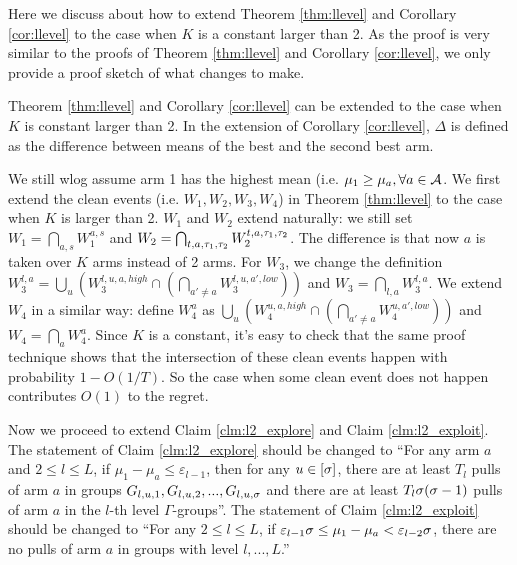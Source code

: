 Here we discuss about how to extend Theorem \ref{thm:llevel} and Corollary \ref{cor:llevel} to the case when $K$ is a constant larger than 2. As the proof is very similar to the proofs of Theorem \ref{thm:llevel} and Corollary \ref{cor:llevel}, we only provide a proof sketch of what changes to make.

\begin{theorem}
\label{thm:constarm}
Theorem \ref{thm:llevel} and Corollary \ref{cor:llevel} can be extended to the case when $K$ is constant larger than 2. In the extension of Corollary \ref{cor:llevel}, $\Delta$ is defined as the difference between means of the best and the second best arm.
\end{theorem}

We still wlog assume arm 1 has the highest mean (i.e. $\mu_1 \geq \mu_a, \forall a \in \mathcal{A}$. We first extend the clean events (i.e. $W_1,W_2,W_3,W_4$) in Theorem \ref{thm:llevel} to the case when $K$ is larger than 2. $W_1$ and $W_2$ extend naturally: we still set $W_1 = \bigcap_{a,s}W_1^{a,s}$ and $W_2 = \bigcap_{t,a,\tau_1,\tau_2} W_2^{t,a,\tau_1,\tau_2}$. The difference is that now $a$ is taken over $K$ arms instead of 2 arms. For $W_3$, we change the definition $W_3^{l,a} = \bigcup_u \left(W_3^{l,u,a,high}  \cap \left(\bigcap_{a' \neq a} W_3^{l,u,a',low}\right) \right)$ and $W_3 = \bigcap_{l,a} W_3^{l,a}$. We extend $W_4$ in a similar way: define $W^{a}_4$ as $\bigcup_u \left(W_4^{u,a,high} \cap \left(\bigcap_{a' \neq a} W_4^{u,a',low}\right) \right)$ and $W_4 = \bigcap_a W^a_4$. Since $K$ is a constant, it's easy to check that the same proof technique shows that the intersection of these clean events happen with probability  $1-O(1/T)$. So the case when some clean event does not happen contributes $O(1)$ to the regret. 

Now we proceed to extend Claim \ref{clm:l2_explore} and Claim \ref{clm:l2_exploit}. The statement of Claim \ref{clm:l2_explore} should be changed to ``For any arm $a$ and $2\leq l \leq L$, if $\mu_1 - \mu_a \leq \varepsilon_{l-1}$, then for any $u \in [\sigma]$, there are at least $T_l$ pulls of arm $a$ in groups $G_{l,u,1},G_{l,u,2}, ... ,G_{l,u,\sigma}$ and there are at least $T_l\sigma(\sigma-1)$ pulls of arm $a$ in the $l$-th level $\Gamma$-groups''. The statement of Claim \ref{clm:l2_exploit} should be changed to ``For any $2 \leq l \leq L$, if $\varepsilon_{l-1} \sigma\leq \mu_1 - \mu_a < \varepsilon_{l-2} \sigma$, there are no pulls of arm $a$ in groups with level $l,...,L$.'' 

